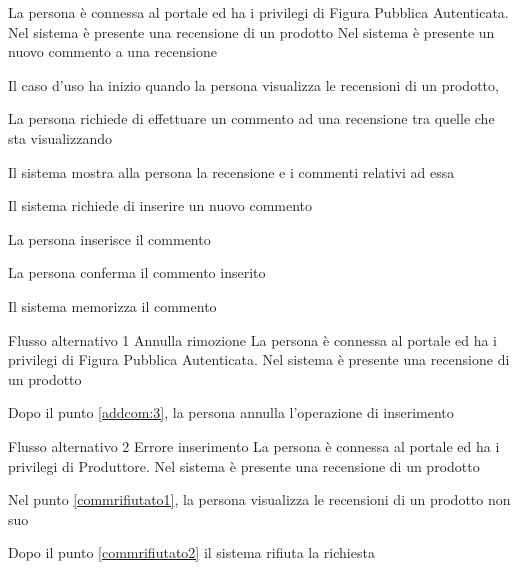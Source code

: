 {}
{La persona è connessa al portale ed ha i privilegi di Figura Pubblica Autenticata. Nel sistema è presente una recensione di un prodotto}
{Nel sistema è presente un nuovo commento a una recensione}
{\begin{enumCU}
	\item Il caso d'uso ha inizio quando la persona visualizza le recensioni di un prodotto, \label{commrifiutato1}
	\item La persona richiede di effettuare un commento ad una recensione tra quelle che sta visualizzando\label{commrifiutato2}
	\item Il sistema mostra alla persona la recensione e i commenti relativi ad essa
	\item Il sistema richiede di inserire un nuovo commento 
	\item La persona inserisce il commento\label{addcom:3}
	\item La persona conferma il commento inserito
	\item Il sistema memorizza il commento
\end{enumCU}}
%
{Flusso alternativo 1}%
{Annulla rimozione}%
{La persona è connessa al portale ed ha i privilegi di Figura Pubblica Autenticata. Nel sistema è presente una recensione di un prodotto}
{\postNulle}%
{\begin{enumCU}
		\item Dopo il punto \ref{addcom:3}, la persona annulla l'operazione di inserimento
	\end{enumCU}}%
%
{Flusso alternativo 2}%
{Errore inserimento}%
{La persona è connessa al portale ed ha i privilegi di Produttore. Nel sistema è presente una recensione di un prodotto}
{\postNulle}%
{\begin{enumCU}
		\item Nel punto \ref{commrifiutato1}, la persona visualizza le recensioni di un prodotto non suo
		\item Dopo il punto \ref{commrifiutato2} il sistema rifiuta la richiesta
	\end{enumCU}}%

\tabcuvspace

